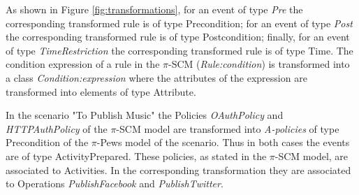 As shown in Figure \ref{fig:transformations}, for an event of type {\sc\em Pre} the corresponding transformed rule is of type {\sc Precondition}; for an event of type {\sc\em Post} the corresponding transformed rule is of type {\sc Postcondition}; finally, for an event of type {\sc\em TimeRestriction} the corresponding transformed rule is of type {\sc Time}. 
The condition expression of a rule in the $\pi$-SCM ({\sc\em Rule:condition}) is transformed into a class {\sc\em Condition:expression} where the attributes of the expression are transformed into elements of type {\sc Attribute}.



%
In the scenario "To Publish Music" the {\sf Policies} {\em OAuthPolicy} and {\em HTTPAuthPolicy} of the $\pi$-SCM model are transformed into {\em A-policies} of type {\sf Precondition} of the $\pi$-{\sc Pews} model of the scenario. Thus in both cases the events are of type {\sf ActivityPrepared}. These policies, as stated in the $\pi$-SCM model, are associated to {\sf Activities}. In the corresponding transformation they are associated to {\sf Operation}s {\em PublishFacebook} and {\em PublishTwitter}.


